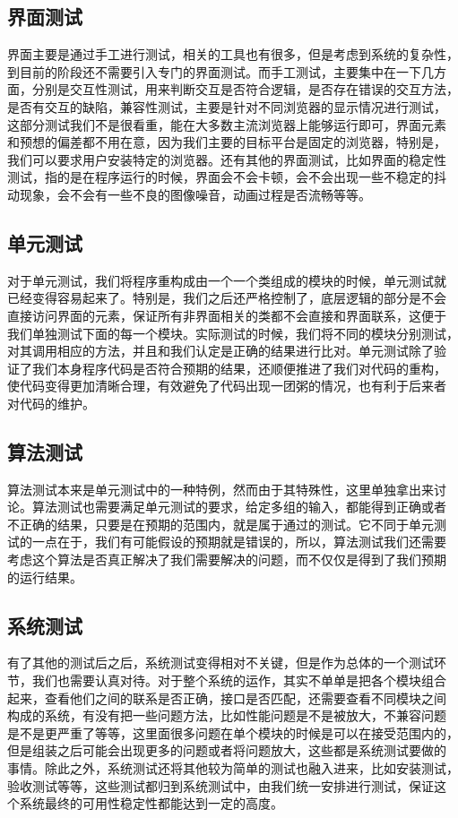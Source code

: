 \subsection{界面测试}
界面主要是通过手工进行测试，相关的工具也有很多，但是考虑到系统的复杂性，
到目前的阶段还不需要引入专门的界面测试。而手工测试，主要集中在一下几方
面，分别是交互性测试，用来判断交互是否符合逻辑，是否存在错误的交互方法，
是否有交互的缺陷，兼容性测试，主要是针对不同浏览器的显示情况进行测试，
这部分测试我们不是很看重，能在大多数主流浏览器上能够运行即可，界面元素
和预想的偏差都不用在意，因为我们主要的目标平台是固定的浏览器，特别是，
我们可以要求用户安装特定的浏览器。还有其他的界面测试，比如界面的稳定性
测试，指的是在程序运行的时候，界面会不会卡顿，会不会出现一些不稳定的抖
动现象，会不会有一些不良的图像噪音，动画过程是否流畅等等。
\subsection{单元测试}
对于单元测试，我们将程序重构成由一个一个类组成的模块的时候，单元测试就
已经变得容易起来了。特别是，我们之后还严格控制了，底层逻辑的部分是不会
直接访问界面的元素，保证所有非界面相关的类都不会直接和界面联系，这便于
我们单独测试下面的每一个模块。实际测试的时候，我们将不同的模块分别测试，
对其调用相应的方法，并且和我们认定是正确的结果进行比对。单元测试除了验
证了我们本身程序代码是否符合预期的结果，还顺便推进了我们对代码的重构，
使代码变得更加清晰合理，有效避免了代码出现一团粥的情况，也有利于后来者
对代码的维护。
\subsection{算法测试}
算法测试本来是单元测试中的一种特例，然而由于其特殊性，这里单独拿出来讨
论。算法测试也需要满足单元测试的要求，给定多组的输入，都能得到正确或者
不正确的结果，只要是在预期的范围内，就是属于通过的测试。它不同于单元测
试的一点在于，我们有可能假设的预期就是错误的，所以，算法测试我们还需要
考虑这个算法是否真正解决了我们需要解决的问题，而不仅仅是得到了我们预期
的运行结果。
\subsection{系统测试}
有了其他的测试后之后，系统测试变得相对不关键，但是作为总体的一个测试环
节，我们也需要认真对待。对于整个系统的运作，其实不单单是把各个模块组合
起来，查看他们之间的联系是否正确，接口是否匹配，还需要查看不同模块之间
构成的系统，有没有把一些问题方法，比如性能问题是不是被放大，不兼容问题
是不是更严重了等等，这里面很多问题在单个模块的时候是可以在接受范围内的，
但是组装之后可能会出现更多的问题或者将问题放大，这些都是系统测试要做的
事情。除此之外，系统测试还将其他较为简单的测试也融入进来，比如安装测试，
验收测试等等，这些测试都归到系统测试中，由我们统一安排进行测试，保证这
个系统最终的可用性稳定性都能达到一定的高度。
